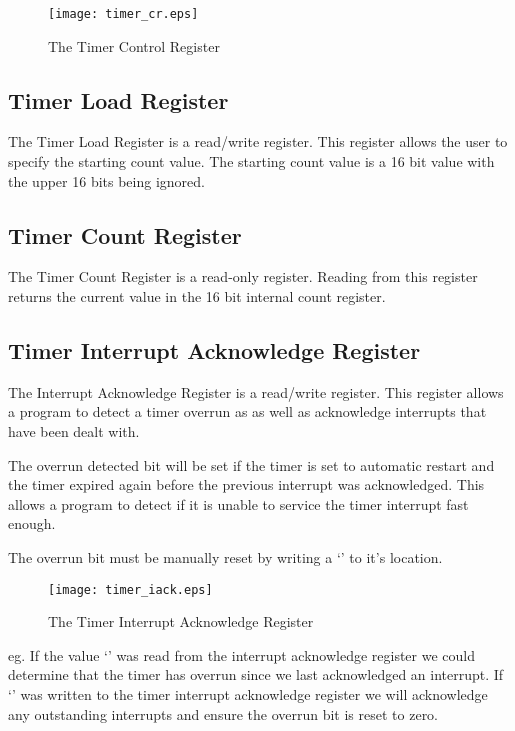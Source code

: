 \documentclass[a4paper,10pt]{article}
\begin{document}
\begin{figure}[h]
\begin{center}
\texttt{[image: timer\_cr.eps]}
\caption{The Timer Control Register}
\label{timer_cr_pic}
\end{center}
\end{figure}

\subsection{Timer Load Register}

The Timer Load Register is a read/write register. This register allows
the user to specify the starting count value. The starting count value
is a 16 bit value with the upper 16 bits being ignored.

\subsection{Timer Count Register}

The Timer Count Register is a read-only register. Reading from this
register returns the current value in the 16 bit internal count
register.

\subsection{Timer Interrupt Acknowledge Register}

The Interrupt Acknowledge Register is a read/write register. This
register allows a program to detect a timer overrun as as well as
acknowledge interrupts that have been dealt with.

The overrun detected bit will be set if the timer is set to automatic
restart and the timer expired again before the previous interrupt was
acknowledged. This allows a program to detect if it is unable to
service the timer interrupt fast enough.

The overrun bit must be manually reset by writing a `' to
it's location.

\begin{figure}[h]
\begin{center}
\texttt{[image: timer\_iack.eps]}
\caption{The Timer Interrupt Acknowledge Register}
\label{timer_iack_pic}
\end{center}
\end{figure}

eg. If the value `' was read from the interrupt acknowledge
register we could determine that the timer has overrun since we last
acknowledged an interrupt. If `' was written to the timer
interrupt acknowledge register we will acknowledge any outstanding
interrupts and ensure the overrun bit is reset to zero.
\end{document}

